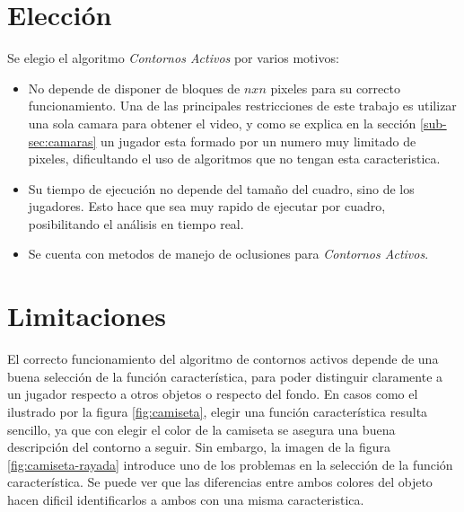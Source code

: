 \section{Elección}
\label{sec:eleccion}

Se elegio el algoritmo \emph{Contornos Activos} por varios motivos:
\begin{itemize}
\item No depende de disponer de bloques de $n x n$ pixeles para su correcto funcionamiento. Una de
las principales restricciones de este trabajo es utilizar una sola camara para obtener el video, y
como se explica en la sección \ref{sub-sec:camaras} un jugador esta formado por un numero muy limitado de pixeles, dificultando el uso de algoritmos que no tengan esta caracteristica.

\item Su tiempo de ejecución no depende del tamaño del cuadro, sino de los jugadores. Esto hace que sea muy rapido de ejecutar por cuadro, posibilitando el análisis en tiempo real.

\item Se cuenta con metodos de manejo de oclusiones para \emph{Contornos Activos}\cite{paper-juliana}.

\end{itemize}

\section{Limitaciones}
\label{sec:ac-problemas}

El correcto funcionamiento del algoritmo de contornos
activos\cite{fast-level-set} depende de una buena selección de la función
característica, para poder distinguir claramente a un jugador respecto a otros
objetos o respecto del fondo. En casos como el ilustrado por la figura
\ref{fig:camiseta}, elegir una función característica resulta sencillo, ya que
con elegir el color de la camiseta se asegura una buena descripción del contorno
a seguir. Sin embargo, la imagen de la figura \ref{fig:camiseta-rayada} introduce
uno de los problemas en la selección de la función característica. Se puede ver que
las diferencias entre ambos colores del objeto hacen dificil identificarlos a ambos
con una misma caracteristica.

